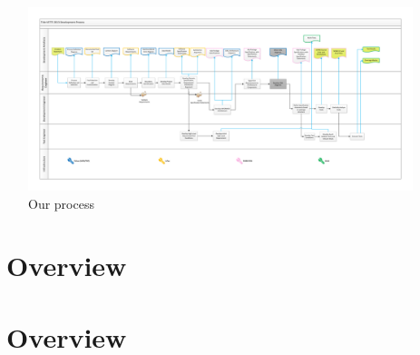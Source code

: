 \begin{figure}
    \includegraphics[width=\textwidth]{SwimLaneProcessDiagram.pdf}
    \caption{Our process}
    \label{fig:the_process}
\end{figure}

\section{\reveal\ Overview}


\section{\informed\ Overview}

